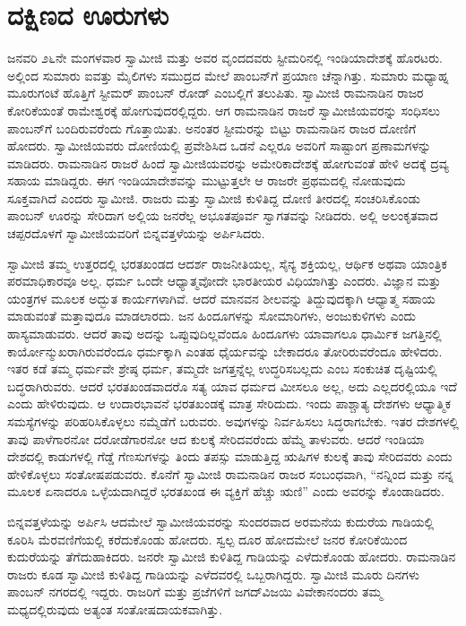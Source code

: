 
\chapter{ದಕ್ಷಿಣದ ಊರುಗಳು }

 ಜನವರಿ ೨೬ನೇ ಮಂಗಳವಾರ ಸ್ವಾಮೀಜಿ ಮತ್ತು ಅವರ ವೃಂದದವರು ಸ್ಟೀಮರಿನಲ್ಲಿ ಇಂಡಿಯಾದೇಶಕ್ಕೆ ಹೊರಟರು. ಅಲ್ಲಿಂದ ಸುಮಾರು ಐವತ್ತು ಮೈಲಿಗಳು ಸಮುದ್ರದ ಮೇಲೆ ಪಾಂಬನ್‌ಗೆ ಪ್ರಯಾಣ ಚೆನ್ನಾಗಿತ್ತು. ಸುಮಾರು ಮಧ್ಯಾಹ್ನ ಮೂರುಗಂಟೆ ಹೊತ್ತಿಗೆ ಸ್ಟೀಮರ್ ಪಾಂಬನ್ ರೋಡ್ ಎಂಬಲ್ಲಿಗೆ ತಲುಪಿತು. ಸ್ವಾಮೀಜಿ ರಾಮನಾಡಿನ ರಾಜರ ಕೋರಿಕೆಯಂತೆ ರಾಮೇಶ್ವರಕ್ಕೆ ಹೋಗುವುದರಲ್ಲಿದ್ದರು. ಆಗ ರಾಮನಾಡಿನ ರಾಜರೆ ಸ್ವಾಮೀಜಿಯವರನ್ನು ಸಂಧಿಸಲು ಪಾಂಬನ್‌ಗೆ ಬಂದಿರುವರೆಂದು ಗೊತ್ತಾಯಿತು. ಅನಂತರ ಸ್ಟೀಮರನ್ನು ಬಿಟ್ಟು ರಾಮನಾಡಿನ ರಾಜರ ದೋಣಿಗೆ ಹೋದರು. ಸ್ವಾಮೀಜಿಯವರು ದೋಣಿಯಲ್ಲಿ ಪ್ರವೇಶಿಸಿದ ಒಡನೆ ಎಲ್ಲರೂ ಅವರಿಗೆ ಸಾಷ್ಟಾಂಗ ಪ್ರಣಾಮಗಳನ್ನು ಮಾಡಿದರು. ರಾಮನಾಡಿನ ರಾಜರೆ ಹಿಂದೆ ಸ್ವಾಮೀಜಿಯವರನ್ನು ಅಮೇರಿಕಾದೇಶಕ್ಕೆ ಹೋಗುವಂತೆ ಹೇಳಿ ಅದಕ್ಕೆ ದ್ರವ್ಯ ಸಹಾಯ ಮಾಡಿದ್ದರು. ಈಗ ಇಂಡಿಯಾದೇಶವನ್ನು ಮುಟ್ಟುತ್ತಲೇ ಆ ರಾಜರೇ ಪ್ರಥಮದಲ್ಲಿ ನೋಡುವುದು ಸೂಕ್ತವಾಗಿದೆ ಎಂದರು ಸ್ವಾಮೀಜಿ. ರಾಜರು ಮತ್ತು ಸ್ವಾಮೀಜಿ ಕುಳಿತಿದ್ದ ದೋಣಿ ತೀರದಲ್ಲಿ ಸಂಚರಿಸಿಕೊಂಡು ಪಾಂಬನ್ ಊರನ್ನು ಸೇರಿದಾಗ ಅಲ್ಲಿಯ ಜನರೆಲ್ಲ ಅಭೂತಪೂರ್ವ ಸ್ವಾಗತವನ್ನು ನೀಡಿದರು. ಅಲ್ಲಿ ಅಲಂಕೃತವಾದ ಚಪ್ಪರದೊಳಗೆ ಸ್ವಾಮೀಜಿಯವರಿಗೆ ಬಿನ್ನವತ್ತಳೆಯನ್ನು ಅರ್ಪಿಸಿದರು. 

 ಸ್ವಾಮೀಜಿ ತಮ್ಮ ಉತ್ತರದಲ್ಲಿ ಭರತಖಂಡದ ಆದರ್ಶ ರಾಜನೀತಿಯಲ್ಲ, ಸೈನ್ಯ ಶಕ್ತಿಯಲ್ಲ, ಆರ್ಥಿಕ ಅಥವಾ ಯಾಂತ್ರಿಕ ಪರಮಾಧಿಕಾರವೂ ಅಲ್ಲ. ಧರ್ಮ ಒಂದೇ ಆಧ್ಯಾತ್ಮವೋದೇ ಭಾರತೀಯರ ವಿಧಿಯಾಗಿತ್ತು ಎಂದರು. ವಿಜ್ಞಾನ ಮತ್ತು ಯಂತ್ರಗಳ ಮೂಲಕ ಅದ್ಭುತ ಕಾರ್ಯಗಳಾಗಿವೆ. ಆದರೆ ಮಾನವನ ಶೀಲವನ್ನು ತಿದ್ದುವುದಕ್ಕಾಗಿ ಆಧ್ಯಾತ್ಮ ಸಹಾಯ ಮಾಡುವಂತೆ ಮತ್ತಾವುದೂ ಮಾಡಲಾರದು. ಜನ ಹಿಂದೂಗಳನ್ನು ಸೋಮಾರಿಗಳು, ಅಂಜುಕುಳಿಗಳು ಎಂದು ಹಾಸ್ಯಮಾಡುವರು. ಆದರೆ ತಾವು ಅದನ್ನು ಒಪ್ಪುವುದಿಲ್ಲವೆಂದೂ ಹಿಂದೂಗಳು ಯಾವಾಗಲೂ ಧಾರ್ಮಿಕ ಜಗತ್ತಿನಲ್ಲಿ ಕಾರ್ಯೋನ್ಮುಖರಾಗಿರುವರೆಂದೂ ಧರ್ಮಕ್ಕಾಗಿ ಎಂತಹ ಧೈರ್ಯವನ್ನು ಬೇಕಾದರೂ ತೋರಿರುವರೆಂದೂ ಹೇಳಿದರು. ಇತರ ಕಡೆ ತಮ್ಮ ಧರ್ಮವೇ ಶ್ರೇಷ್ಠ ಧರ್ಮ, ತಮ್ಮದೇ ಜಗತ್ತನ್ನೆಲ್ಲ ಉದ್ಧರಿಸಬಲ್ಲದು ಎಂಬ ಸಂಕುಚಿತ ದೃಷ್ಟಿಯಲ್ಲಿ ಬದ್ಧರಾಗಿರುವರು. ಆದರೆ ಭರತಖಂಡವಾದರೊ ಸತ್ಯ ಯಾವ ಧರ್ಮದ ಮೀಸಲೂ ಅಲ್ಲ, ಅದು ಎಲ್ಲದರಲ್ಲಿಯೂ ಇದೆ ಎಂದು ಹೇಳಿರುವುದು. ಆ ಉದಾರಭಾವನೆ ಭರತಖಂಡಕ್ಕೆ ಮಾತ್ರ ಸೇರಿದುದು. ಇಂದು ಪಾಶ್ಚಾತ್ಯ ದೇಶಗಳು ಆಧ್ಯಾತ್ಮಿಕ ಸಮಸ್ಯೆಗಳನ್ನು ಪರಿಹರಿಸಿಕೊಳ್ಳಲು ನಮ್ಮೆಡೆಗೆ ಬರುವರು. ಅವುಗಳನ್ನು ನಿರ್ವಹಿಸಲು ಸಿದ್ಧರಾಗಬೇಕು. ಇತರ ದೇಶಗಳಲ್ಲಿ ತಾವು ಪಾಳೆಗಾರನೋ ದರೋಡೆಗಾರನೋ ಆದ ಕುಲಕ್ಕೆ ಸೇರಿದವರೆಂದು ಹೆಮ್ಮೆ ತಾಳುವರು. ಆದರೆ ಇಂಡಿಯಾ ದೇಶದಲ್ಲಿ ಕಾಡುಗಳಲ್ಲಿ ಗೆಡ್ಡೆ ಗೆಣಸುಗಳನ್ನು ತಿಂದು ತಪಸ್ಸು ಮಾಡುತ್ತಿದ್ದ ಋಷಿಗಳ ಕುಲಕ್ಕೆ ತಾವು ಸೇರಿದವರು ಎಂದು ಹೇಳಿಕೊಳ್ಳಲು ಸಂತೋಷಪಡುವರು. ಕೊನೆಗೆ ಸ್ವಾಮೀಜಿ ರಾಮನಾಡಿನ ರಾಜರ ಸಂಬಂಧವಾಗಿ, “ನನ್ನಿಂದ ಮತ್ತು ನನ್ನ ಮೂಲಕ ಏನಾದರೂ ಒಳ್ಳೆಯದಾಗಿದ್ದರೆ ಭರತಖಂಡ ಈ ವ್ಯಕ್ತಿಗೆ ಹೆಚ್ಚು ಋಣಿ” ಎಂದು ಅವರನ್ನು ಕೊಂಡಾಡಿದರು. 

 ಬಿನ್ನವತ್ತಳೆಯನ್ನು ಅರ್ಪಿಸಿ ಆದಮೇಲೆ ಸ್ವಾಮೀಜಿಯವರನ್ನು ಸುಂದರವಾದ ಅರಮನೆಯ ಕುದುರೆಯ ಗಾಡಿಯಲ್ಲಿ ಕೂರಿಸಿ ಮೆರವಣಿಗೆಯಲ್ಲಿ ಕರೆದುಕೊಂಡು ಹೋದರು. ಸ್ವಲ್ಪ ದೂರ ಹೋದಮೇಲೆ ಜನರ ಕೋರಿಕೆಯಿಂದ ಕುದುರೆಯನ್ನು ತೆಗೆದುಹಾಕಿದರು. ಜನರೇ ಸ್ವಾಮೀಜಿ ಕುಳಿತಿದ್ದ ಗಾಡಿಯನ್ನು ಎಳೆದುಕೊಂಡು ಹೋದರು. ರಾಮನಾಡಿನ ರಾಜರು ಕೂಡ ಸ್ವಾಮೀಜಿ ಕುಳಿತಿದ್ದ ಗಾಡಿಯನ್ನು ಎಳೆದವರಲ್ಲಿ ಒಬ್ಬರಾಗಿದ್ದರು. ಸ್ವಾಮೀಜಿ ಮೂರು ದಿನಗಳು ಪಾಂಬನ್ ನಗರದಲ್ಲಿ ಇದ್ದರು. ರಾಜರಿಗೆ ಮತ್ತು ಪ್ರಜೆಗಳಿಗೆ ಜಗದ್‌ವಿಜಯಿ ವಿವೇಕಾನಂದರು ತಮ್ಮ ಮಧ್ಯದಲ್ಲಿರುವುದು ಅತ್ಯಂತ ಸಂತೋಷದಾಯಕವಾಗಿತ್ತು. 

